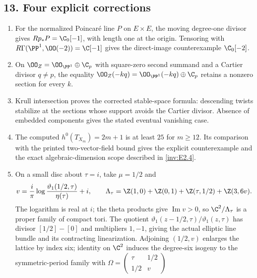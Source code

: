 \subsection*{13. Four explicit corrections}
\RungOne
\begin{enumerate}[label=\arabic*.,leftmargin=*]
\item For the normalized Poincar\'e line $P$ on $E\times E$,
the moving degree-one divisor gives
$Rp_*P=\C_0[-1]$, with length one at the origin.
Tensoring with $R\Gamma(\PP^1,\OO(-2))=\C[-1]$ gives the
direct-image counterexample $\C_0[-2]$.
\item On $\OO_Z=\OO_{\PP^1}\oplus\C_p$ with square-zero
second summand and a Cartier divisor $q\ne p$, the equality
$\OO_Z(-kq)=\OO_{\PP^1}(-kq)\oplus\C_p$ retains a nonzero
section for every $k$.
\item Krull intersection proves the corrected stable-space
formula: descending twists stabilize at the sections whose
support avoids the Cartier divisor.  Absence of embedded
components gives the stated eventual vanishing case.
\item The computed $h^0(T_{X_m})=2m+1$ is at least $25$ for
$m\ge12$.  Its comparison with the printed two-vector-field
bound gives the explicit counterexample and the exact
algebraic-dimension scope described in \ref{inv:E2.4}.
\item On a small disc about $\tau=i$, take $\mu=1/2$ and
\[
 v=\frac{i}{\pi}\log\frac{\vartheta_1(1/2,\tau)}{\eta(\tau)}+i,
 \qquad
 \Lambda_\tau=\Z(1,0)+\Z(0,1)+\Z(\tau,1/2)+\Z(3,6v).
\]
The logarithm is real at $i$; the theta products give
$\operatorname{Im}v>0$, so $\C^2/\Lambda_\tau$ is a proper
family of compact tori.  The quotient
$\vartheta_1(z-1/2,\tau)/\vartheta_1(z,\tau)$ has divisor
$[1/2]-[0]$ and multipliers $1,-1$, giving the actual elliptic
line bundle and its contracting linearization.  Adjoining
$(1/2,v)$ enlarges the lattice by index six; identity on
$\C^2$ induces the degree-six isogeny to the symmetric-period
family with $\Omega=\left(\begin{smallmatrix}\tau&1/2\\1/2&v\end{smallmatrix}\right)$

\end{enumerate}
